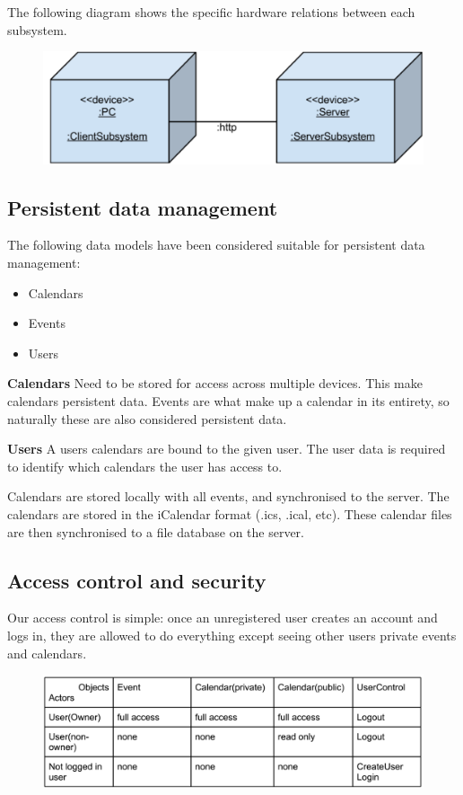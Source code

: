 \documentclass[10pt]{report}
\numberwithin{equation}{section} %
\numberwithin{figure}{section} %
\numberwithin{table}{section} %
\begin{document}
The following diagram shows the specific hardware relations between each
subsystem.
\begin{figure}[H]
  \includegraphics[scale=0.7]{components.png}
\end{figure}

\subsection{Persistent data management}
The following data models have been considered suitable for persistent data
management:
\begin{itemize}
\item Calendars
\item Events
\item Users
\end{itemize}

\textbf{Calendars}  Need to be stored for access across multiple devices. This make
calendars persistent data. Events are what make up a calendar in its entirety,
so naturally these are also considered persistent data.


\textbf{Users} A users calendars are bound to the given user. The user data is required
to identify which calendars the user has access to.


Calendars are stored locally with all events, and synchronised to the
server. The calendars are stored in the iCalendar format (.ics, .ical,
etc). These calendar files are then synchronised to a file database on the
server.

\subsection{Access control and security}
Our access control is simple: once an unregistered user creates an account and
logs in, they are allowed to do everything except seeing other users private
events and calendars.

\begin{figure}[H]
  \includegraphics[scale=0.7]{accesscontrol.png}
\end{figure}
\end{document}
